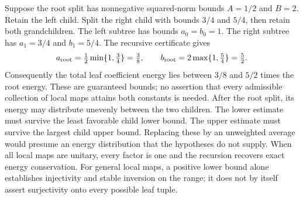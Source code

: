 Suppose the root split has nonnegative squared-norm bounds $A=1/2$ and $B=2$. Retain the left child. Split the right child with bounds $3/4$ and $5/4$, then retain both grandchildren.
The left subtree has bounds $a_0=b_0=1$. The right subtree has $a_1=3/4$ and $b_1=5/4$. The recursive certificate gives
\[
a_{\rm root}=\tfrac12\min\{1,\tfrac34\}=\tfrac38,
\qquad
b_{\rm root}=2\max\{1,\tfrac54\}=\tfrac52.
\]
Consequently the total leaf coefficient energy lies between $3/8$ and $5/2$ times the root energy. These are guaranteed bounds; no assertion that every admissible collection of local maps attains both constants is needed.
After the root split, its energy may distribute unevenly between the two children. The lower estimate must survive the least favorable child lower bound. The upper estimate must survive the largest child upper bound. Replacing these by an unweighted average would presume an energy distribution that the hypotheses do not supply.
When all local maps are unitary, every factor is one and the recursion recovers exact energy conservation. For general local maps, a positive lower bound alone establishes injectivity and stable inversion on the range; it does not by itself assert surjectivity onto every possible leaf tuple.

